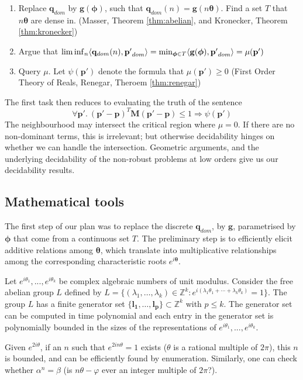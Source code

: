 \begin{enumerate}
\item Replace $\mathbf{q}_{dom}$ by $\mathbf{g}(\boldsymbol{\phi})$, such that $\mathbf{q}_{dom}(n) = \mathbf{g}(n\boldsymbol{\theta})$. Find a set $T$ that $n\boldsymbol\theta$ are dense in. (Masser, Theorem \ref{thm:abelian}, and Kronecker, Theorem \ref{thm:kronecker})
\item Argue that $\liminf_n  \langle\mathbf{q}_{dom}(n), \mathbf{p'}_{dom}\rangle = \min_{\boldsymbol{\phi} \in T} \langle\mathbf{g}(\boldsymbol{\phi}), \mathbf{p'}_{dom}\rangle  = \mu(\mathbf{p'})$
\item Query $\mu$. Let $\psi(\mathbf{p'})$ denote the formula that $\mu(\mathbf{p'}) \ge 0$ (First Order Theory of Reals, Renegar, Theroem \ref{thm:renegar})
\end{enumerate}
The first task then reduces to evaluating the truth of the sentence 
$$
\forall \mathbf{p'}.~ (\mathbf{p'} - \mathbf{p})^T\mathbf{M}(\mathbf{p'} - \mathbf{p}) \le 1 \Rightarrow \psi(\mathbf{p'})
$$
The neighbourhood may intersect the critical region where $\mu = 0$. If there are no non-dominant terms, this is irrelevant; but otherwise decidability hinges on whether we can handle the intersection. Geometric arguments, and the underlying decidability of the non-robust problems at low orders \cite{joeljames3} give us our decidability results.

\subsection{Mathematical tools}
\label{arsenal}
The first step of our plan was to replace the discrete $\mathbf{q}_{dom}$, by $\mathbf{g}$, parametrised by $\boldsymbol\phi$ that come from a continuous set $T$. The preliminary step is to efficiently elicit additive relations among $\boldsymbol\theta$, which translate into multiplicative relationships among the corresponding characteristic roots $e^{i\boldsymbol\theta}$.
 \begin{theorem}
  \label{thm:abelian}
  Let $e^{i \theta_1},...,e^{i \theta_k}$ be complex algebraic numbers of unit modulus. Consider the free abelian group $L$ defined by $L = \{(\lambda_1, \ldots ,\lambda_k) \in \mathbb{Z}^k: 
  e^{i (\lambda_1 \theta_1 + \cdots +  \lambda_k \theta_k)} = 1 \}$. 
  The group $L$ has a finite generator set $\{ \mathbf{l_1}, \ldots, \mathbf{l_p}\} \subset \mathbb{Z}^k$ with $p \le k$. The generator set can be computed in time polynomial and
  each entry in the generator set is polynomially bounded in the sizes of the representations of $e^{i \theta_1},...,e^{i \theta_k}$.
  \end{theorem}
 Given $e^{2i\theta}$, if an $n$ such that $e^{2i n \theta} = 1$ exists ($\theta$ is a rational multiple of $2\pi$), this $n$ is bounded, and can be efficiently found by enumeration. Similarly, one can check whether $\alpha^n = \beta$ (is $n\theta - \varphi$ ever an integer multiple of $2\pi$?). 
 

